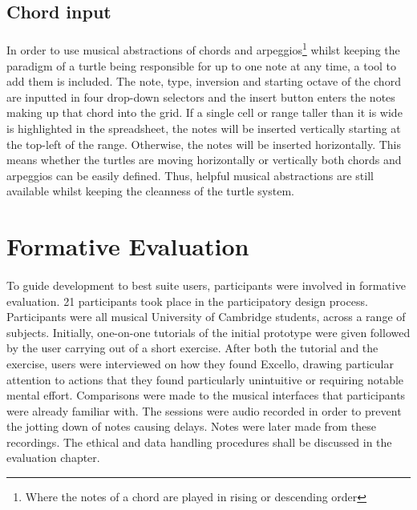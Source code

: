 \subsection{Chord input}

\paragraph{} In order to use musical abstractions of chords and arpeggios\footnote{Where the notes of a chord are played in rising or descending order} whilst keeping the paradigm of a turtle being responsible for up to one note at any time, a tool to add them is included. The note, type, inversion and starting octave of the chord are inputted in four drop-down selectors and the insert button enters the notes making up that chord into the grid. If a single cell or range taller than it is wide is highlighted in the spreadsheet, the notes will be inserted vertically starting at the top-left of the range. Otherwise, the notes will be inserted horizontally. This means whether the turtles are moving horizontally or vertically both chords and arpeggios can be easily defined. Thus, helpful musical abstractions are still available whilst keeping the cleanness of the turtle system.

\section{Formative Evaluation}

\paragraph{} To guide development to best suite users, participants were involved in formative evaluation. 21 participants took place in the participatory design process. Participants were all musical University of Cambridge students, across a range of subjects. Initially, one-on-one tutorials of the initial prototype were given followed by the user carrying out of a short exercise. After both the tutorial and the exercise, users were interviewed on how they found Excello, drawing particular attention to actions that they found particularly unintuitive or requiring notable mental effort. Comparisons were made to the musical interfaces that participants were already familiar with. The sessions were audio recorded in order to prevent the jotting down of notes causing delays. Notes were later made from these recordings. The ethical and data handling procedures shall be discussed in the evaluation chapter.

